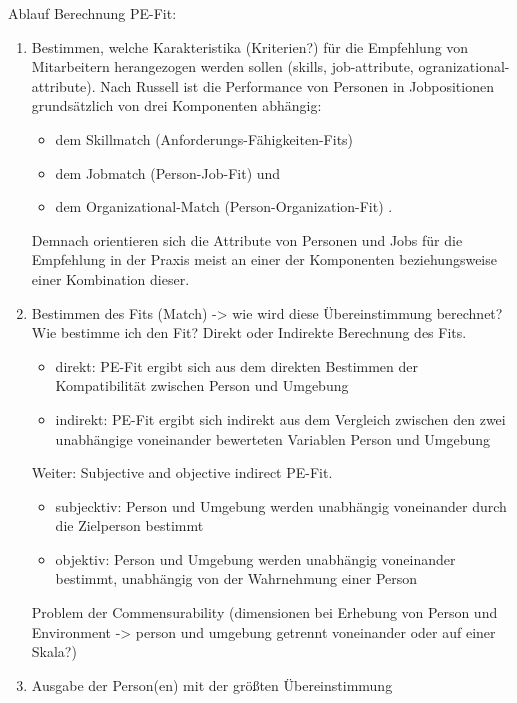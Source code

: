 Ablauf Berechnung PE-Fit:
\begin{enumerate}
    \item Bestimmen, welche Karakteristika (Kriterien?) für die Empfehlung von Mitarbeitern herangezogen werden sollen (skills, job-attribute, ogranizational-attribute).
Nach Russell ist die Performance von Personen in Jobpositionen grundsätzlich von drei Komponenten abhängig:
\begin{itemize}
    \item dem Skillmatch (Anforderungs-Fähigkeiten-Fits)
    \item dem Jobmatch (Person-Job-Fit) und
    \item dem Organizational-Match (Person-Organization-Fit) \cite{russell:book}.
\end{itemize}
Demnach orientieren sich die Attribute von Personen und Jobs für die Empfehlung in der Praxis meist an einer der Komponenten beziehungsweise einer Kombination dieser.
 \item Bestimmen des Fits (Match) -> wie wird diese Übereinstimmung berechnet?
Wie bestimme ich den Fit? Direkt oder Indirekte Berechnung des Fits. %
\begin{itemize}
    \item direkt: PE-Fit ergibt sich aus dem direkten Bestimmen der Kompatibilität zwischen Person und Umgebung
    \item indirekt: PE-Fit ergibt sich indirekt aus dem Vergleich zwischen den zwei unabhängige voneinander bewerteten Variablen Person und Umgebung
\end{itemize}
Weiter: Subjective and objective indirect PE-Fit.
\begin{itemize}
    \item subjecktiv: Person und Umgebung werden unabhängig voneinander durch die Zielperson bestimmt
    \item objektiv: Person und Umgebung werden unabhängig voneinander bestimmt, unabhängig von der Wahrnehmung einer Person
\end{itemize} %
Problem der Commensurability (dimensionen bei Erhebung von Person und Environment -> person und umgebung getrennt voneinander oder auf einer Skala?) %

\item Ausgabe der Person(en) mit der größten Übereinstimmung
\end{enumerate}

